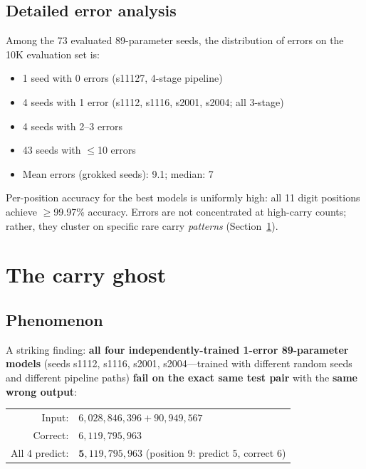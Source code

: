 \documentclass[11pt]{article}
\begin{document}
\subsection{Detailed error analysis}

Among the 73 evaluated 89-parameter seeds, the distribution of errors on
the 10K evaluation set is:

\begin{itemize}[leftmargin=*, itemsep=2pt]
  \item 1 seed with 0 errors (s11127, 4-stage pipeline)
  \item 4 seeds with 1 error (s1112, s1116, s2001, s2004; all 3-stage)
  \item 4 seeds with 2--3 errors
  \item 43 seeds with $\leq$10 errors
  \item Mean errors (grokked seeds): 9.1; median: 7
\end{itemize}

Per-position accuracy for the best models is uniformly high: all 11
digit positions achieve $\geq$99.97\% accuracy. Errors are not
concentrated at high-carry counts; rather, they cluster on specific rare
carry \emph{patterns} (Section~\ref{sec:analysis}).

\section{The carry ghost}
\label{sec:analysis}

\subsection{Phenomenon}

A striking finding: \textbf{all four independently-trained 1-error
89-parameter models} (seeds s1112, s1116, s2001, s2004---trained with
different random seeds and different pipeline paths) \textbf{fail on the
exact same test pair} with the \textbf{same wrong output}:

\begin{center}
\begin{tabular}{rl}
  Input:      & $6{,}028{,}846{,}396 + 90{,}949{,}567$ \\
  Correct:    & $6{,}119{,}795{,}963$ \\
  All 4 predict: & $\mathbf{5}{,}119{,}795{,}963$ \quad (position 9: predict 5, correct 6)
\end{tabular}
\end{center}
\end{document}
